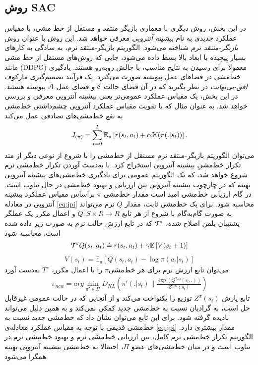 \subsection{روش SAC}
در این بخش، روش دیگری با معماری  بازیگر-منتقد و مستقل از خط مشی، با مقیاس عملکرد جدیدی به نام
\textit{بیشینه آنتروپی}
معرفی خواهد شد.
این روش با عنوان روش	
\textit{بازیگر-منتقد نرم}
شناخته می‌شود.
الگوریتم  بازیگر-منتقد نرم، به سادگی به کارهای بسیار پیچیده با ابعاد بالا بسط داده می‌شود، جایی که روش‌های مستقل از خط مشی‌ مانند
\lr(DDPG)
معمولا برای رسیدن به نتایج مناسب، با چالش روبه‌رو هستند.
یادگیری خط‌مشی در فضاهای عمل پیوسته صورت می‌گیرد. یک فرآیند تصمیم‌گیری مارکوف 
\textit{افق-بی‌نهایت}
در نظر بگیرید که در آن فضای حالت
$\EuScript{S}$
و فضای عمل
$\EuScript{A}$
پیوسته هستند.
در این بخش، یک مقیاس عملکرد عمومی‌تر یعنی بیشینه آنتروپی معرفی و بررسی خواهد شد.
به عنوان مثال 
\cite{ziebart2010modeling}
که با تقویت مقیاس عملکرد آنتروپی چشم‌داشتی خط‌مشی به نفع خط‌مشی‌های تصادفی عمل می‌کند
\begin{align}
J_{(\pi)}= \sum\limits_{t=0}^T \mathbb{E}_\pi \left[ r(s_t , a_t) + \alpha \EuScript{H} (\pi(.|s_t)) \right].
\label{eq:jpi}
\end{align}
می‌توان الگوریتم بازیگر-منتقد نرم مستقل از خط‌مشی را با شروع از نوعی دیگر از متد تکرار خط‌مشیِ بیشینه آنتروپی استخراج کرد.
با به‌دست آوردن تکرار خط‌مشی نرم شروع خواهد شد، که یک الگوریتم عمومی برای یادگیری خط‌مشی‌های بیشینه آنتروپی بهینه که در چارچوب بیشینه آنتروپی بین ارزیابی و بهبود خط‌مشی در حال تناوب است.
در گام ارزیابی خط‌مشی امید است مقدار خط‌مشی
$\pi$
براساس مقیاس عملکرد بیشینه آنتروپی در معادله \ref{eq:jpi} محاسبه شود. برای یک خط‌مشی ثابت، مقدار $Q$  نرم می‌تواند به صورت گام‌به‌گام با شروع از هر تابع
$Q:S \times R \rightarrow R$ 
و اعمال مکرر یک عملگر پشتیبان بلمن اصلاح شده،
$\EuScript{T}^\pi$
که در تابع ارزش حالت نرم به صورت زیر داده شده است، محاسبه شود
\begin{align}
\EuScript{T}^\pi Q(s_t,a_t) \doteq r(s_t,a_t)+\gamma \mathbb{E} \left[ V(s_t+1) \right]
\label{eq:tpi}
\end{align}
\begin{align}
V(s_t)= \mathbb{E}_\pi \left[ Q(s_t,a_t)- \log \pi(a_t | s_t) \right]
\end{align}
می‌توان تابع ارزش نرم برای هر خط‌مشی$\pi$ را با اعمال مکرر، $T^\pi$ به‌دست آورد\\
\begin{align}
\pi_{new} = arg \min_{\pi' \in \Pi} D_{KL}  \left( \pi'(.|s_t) \parallel \frac{\exp{(Q^{\pi_{old}} (s_t,.))}}{Z^{\pi_{old}} (s_t)}\right)
\label{eq:pinew}
\end{align}
تابع پارش 
$Z^\pi (s_t)$
توزیع را یکنواخت می‌کند و از آنجایی که در حالت عمومی غیرقابل حل است، به گرادیان نسبت به خط‌مشی جدید کمکی نمی‌کند و به همین دلیل می‌تواند نادیده گرفته شود. برای این تابع می‌توان نشان داد که خط‌مشی جدید نسبت به خط‌مشی قدیمی با توجه به مقیاس عملکرد معادله‌ی \ref{eq:jpi} مقدار بیشتری دارد. 
الگوریتم تکرار خط‌مشی نرم کامل، بین ارزیابی خط‌مشی نرم و بهبود خط‌مشی نرم در تناوب است و در میان خط‌مشی‌های عضو
$\Pi$،
احتمالا به خط‌مشی بیشینه آنتروپی بهینه همگرا می‌شود.
